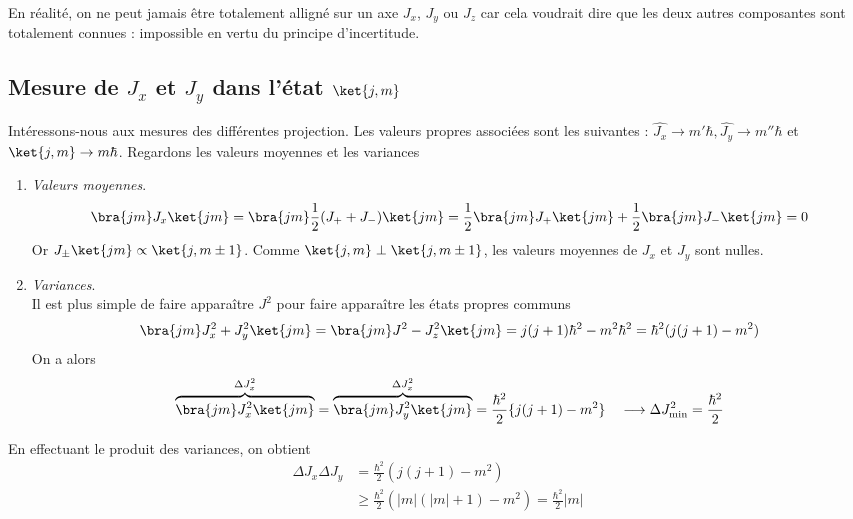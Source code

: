 	En réalité, on ne peut jamais être totalement alligné sur un axe $J_x$, $J_y$ ou $J_z$ car cela 
	voudrait dire que les deux autres composantes sont totalement connues : impossible en vertu du 
	principe d'incertitude.



	\subsection{Mesure de $J_x$ et $J_y$ dans l'état $\ket{j,m}$}
	Intéressons-nous aux mesures des différentes projection. Les valeurs propres associées sont 
	les suivantes : $\hat{J_x}\rightarrow m'\hbar, \hat{J_y}\rightarrow m''\hbar$ et 
	$\ket{j,m}\rightarrow m\hbar$. Regardons les valeurs moyennes et les variances
	\begin{enumerate}
	\item \textit{Valeurs moyennes}.
	\begin{equation}
	\bra{jm}J_x\ket{jm} = \bra{jm}\frac{1}{2}(J_++J_-)\ket{jm} = \frac{1}{2}\bra{jm}J_+\ket{jm}+
	\frac{1}{2}\bra{jm}J_-\ket{jm} =0
	\end{equation}
	Or $J_\pm\ket{jm}\propto \ket{j,m\pm 1}$. Comme $\ket{j,m}\perp\ket{j,m\pm1}$, les valeurs 
	moyennes de $J_x$ et $J_y$ sont nulles.
	\item \textit{Variances}.\\
	Il est plus simple de faire apparaître $J^2$ pour faire apparaître les états propres communs
	\begin{equation}
	\bra{jm} J_x^2+J_y^2 \ket{jm}= \bra{jm}J^2-J_z^2 \ket{jm} = j(j+1)\hbar^2-m^2\hbar^2 = \hbar^2(j(j+1)
	-m^2)
	\end{equation}
	On a alors
	\begin{equation}
	\overbrace{\bra{jm}J_x^2\ket{jm}}^{\Delta J_x^2} = \overbrace{\bra{jm}J_y^2\ket{jm}}^{\Delta J_x^2} 
	= \frac{\hbar^2}{2}\{j(j+1)-m^2\}\quad \longrightarrow \Delta J^2_{\min} = \frac{\hbar^2}{2}
	\end{equation}	
	\end{enumerate}
	En effectuant le produit des variances, on obtient %
	\begin{equation}
	\begin{array}{ll}
	\Delta J_x\Delta J_y &= \frac{\hbar^2}{2}(j(j+1)-m^2)\\
	&\geq \frac{\hbar^2}{2}(|m|(|m|+1)-m^2) = \frac{\hbar^2}{2}|m|
	\end{array}
	\end{equation}
	
